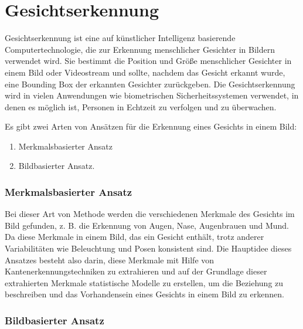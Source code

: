 %
%

\chapter{Gesichtserkennung}\label{FaceDetection}

Gesichtserkennung ist eine auf künstlicher Intelligenz basierende Computertechnologie, die zur Erkennung menschlicher Gesichter in Bildern verwendet wird.
Sie bestimmt die Position und Größe menschlicher Gesichter in einem Bild oder Videostream und sollte, nachdem das Gesicht erkannt wurde, eine Bounding Box der erkannten Gesichter zurückgeben. Die Gesichtserkennung wird in vielen Anwendungen wie biometrischen Sicherheitssystemen verwendet, in denen es möglich ist, Personen in Echtzeit zu verfolgen und zu überwachen.

Es gibt zwei Arten von Ansätzen für die Erkennung eines Gesichts in einem Bild:

\begin{enumerate}
	\item Merkmalsbasierter Ansatz 
	\item Bildbasierter Ansatz.
\end{enumerate} 

\bigskip

\subsection{Merkmalsbasierter Ansatz}

Bei dieser Art von Methode werden die verschiedenen Merkmale des Gesichts im Bild gefunden, z. B. die Erkennung von Augen, Nase, Augenbrauen und Mund. Da diese Merkmale in einem Bild, das ein Gesicht enthält, trotz anderer Variabilitäten wie Beleuchtung und Posen konsistent sind. Die Hauptidee dieses Ansatzes besteht also darin, diese Merkmale mit Hilfe von Kantenerkennungstechniken zu extrahieren und auf der Grundlage dieser extrahierten Merkmale statistische Modelle zu erstellen, um die Beziehung zu beschreiben und das Vorhandensein eines Gesichts in einem Bild zu erkennen.

\subsection{Bildbasierter Ansatz}

